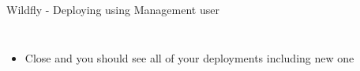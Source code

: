 \documentclass[aspectratio=1610,english]{beamer} %
\begin{document}
	\begin{frame}{Wildfly - Deploying using Management user}
		\begin{columns}
				\begin{itemize}
					\tiny
					\color{black}
					\item Close and you should see all of your deployments including new one
				\end{itemize}
			

\end{columns}
\end{frame}
\end{document}
